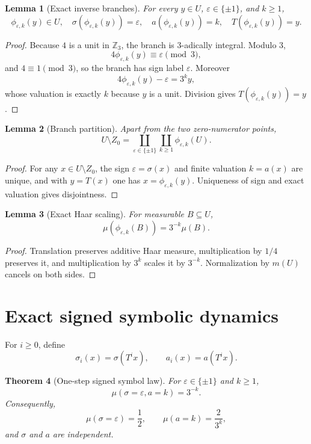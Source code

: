 \documentclass[11pt]{article}
\newtheorem{theorem}{Theorem}[section]
\newtheorem{lemma}[theorem]{Lemma}
\theoremstyle{definition}
\theoremstyle{remark}
\newcommand{\Zthree}{\mathbb Z_3}
\begin{document}
\begin{lemma}[Exact inverse branches]
For every $y\in U$, $\varepsilon\in\{\pm1\}$, and $k\ge1$,
\[
\phi_{\varepsilon,k}(y)\in U,
\quad
\sigma(\phi_{\varepsilon,k}(y))=\varepsilon,
\quad
a(\phi_{\varepsilon,k}(y))=k,
\quad
T(\phi_{\varepsilon,k}(y))=y.
\]
\end{lemma}

\begin{proof}
Because $4$ is a unit in $\Zthree$, the branch is $3$-adically integral.  Modulo $3$,
\[
4\phi_{\varepsilon,k}(y)\equiv\varepsilon\pmod3,
\]
and $4\equiv1\pmod3$, so the branch has sign label $\varepsilon$.  Moreover
\[
4\phi_{\varepsilon,k}(y)-\varepsilon=3^k y,
\]
whose valuation is exactly $k$ because $y$ is a unit.  Division gives $T(\phi_{\varepsilon,k}(y))=y$.
\end{proof}

\begin{lemma}[Branch partition]
Apart from the two zero-numerator points,
\[
U\setminus Z_0
=
\coprod_{\varepsilon\in\{\pm1\}}
\coprod_{k\ge1}
\phi_{\varepsilon,k}(U).
\]
\end{lemma}

\begin{proof}
For any $x\in U\setminus Z_0$, the sign $\varepsilon=\sigma(x)$ and finite valuation $k=a(x)$ are unique, and with $y=T(x)$ one has $x=\phi_{\varepsilon,k}(y)$.  Uniqueness of sign and exact valuation gives disjointness.
\end{proof}

\begin{lemma}[Exact Haar scaling]
For measurable $B\subseteq U$,
\[
\mu(\phi_{\varepsilon,k}(B))=3^{-k}\mu(B).
\]
\end{lemma}

\begin{proof}
Translation preserves additive Haar measure, multiplication by $1/4$ preserves it, and multiplication by $3^k$ scales it by $3^{-k}$.  Normalization by $m(U)$ cancels on both sides.
\end{proof}

\section{Exact signed symbolic dynamics}

For $i\ge0$, define
\[
\sigma_i(x)=\sigma(T^i x),
\qquad
a_i(x)=a(T^i x).
\]

\begin{theorem}[One-step signed symbol law]
For $\varepsilon\in\{\pm1\}$ and $k\ge1$,
\[
\mu(\sigma=\varepsilon,a=k)=3^{-k}.
\]
Consequently,
\[
\mu(\sigma=\varepsilon)=\frac12,
\qquad
\mu(a=k)=\frac{2}{3^k},
\]
and $\sigma$ and $a$ are independent.
\end{theorem}
\end{document}
